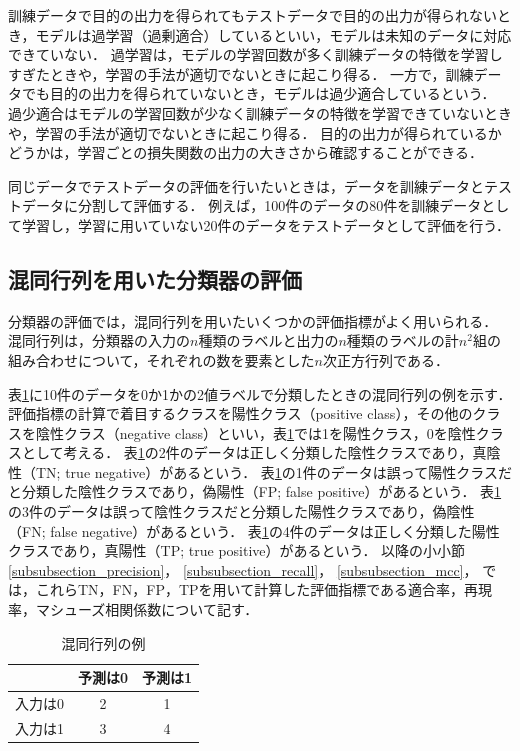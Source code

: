 \documentclass[12pt,a4j]{jreport}
\begin{document}
訓練データで目的の出力を得られてもテストデータで目的の出力が得られないとき，モデルは過学習（過剰適合）しているといい，モデルは未知のデータに対応できていない．
過学習は，モデルの学習回数が多く訓練データの特徴を学習しすぎたときや，学習の手法が適切でないときに起こり得る．
一方で，訓練データでも目的の出力を得られていないとき，モデルは過少適合しているという．
過少適合はモデルの学習回数が少なく訓練データの特徴を学習できていないときや，学習の手法が適切でないときに起こり得る．
目的の出力が得られているかどうかは，学習ごとの損失関数の出力の大きさから確認することができる．

同じデータでテストデータの評価を行いたいときは，データを訓練データとテストデータに分割して評価する．
例えば，100件のデータの80件を訓練データとして学習し，学習に用いていない20件のデータをテストデータとして評価を行う．


\subsection{混同行列を用いた分類器の評価}
分類器の評価では，混同行列を用いたいくつかの評価指標がよく用いられる\cite{aurellen20}．
混同行列は，分類器の入力の$n$種類のラベルと出力の$n$種類のラベルの計$n^2$組の組み合わせについて，それぞれの数を要素とした$n$次正方行列である．

表\ref{confusion_matrix}に10件のデータを0か1かの2値ラベルで分類したときの混同行列の例を示す．
評価指標の計算で着目するクラスを陽性クラス（positive class），その他のクラスを陰性クラス（negative class）といい，表\ref{confusion_matrix}では1を陽性クラス，0を陰性クラスとして考える．
表\ref{confusion_matrix}の2件のデータは正しく分類した陰性クラスであり，真陰性（TN; true negative）があるという．
表\ref{confusion_matrix}の1件のデータは誤って陽性クラスだと分類した陰性クラスであり，偽陽性（FP; false positive）があるという．
表\ref{confusion_matrix}の3件のデータは誤って陰性クラスだと分類した陽性クラスであり，偽陰性（FN; false negative）があるという．
表\ref{confusion_matrix}の4件のデータは正しく分類した陽性クラスであり，真陽性（TP; true positive）があるという．
以降の小小節
\ref{subsubsection_precision}，
\ref{subsubsection_recall}，
\ref{subsubsection_mcc}，
では，これらTN，FN，FP，TPを用いて計算した評価指標である適合率，再現率，マシューズ相関係数について記す．

\begin{table}[H]
  \caption{
    混同行列の例
    }
  \vspace{3mm}
  \centering
    \begin{tabular}{c|cc}
     & 予測は0 & 予測は1 \\
    \hline
    入力は0 & 2 & 1 \\
    入力は1 & 3 & 4
  \end{tabular}
  \label{confusion_matrix}
\end{table}
\end{document}
